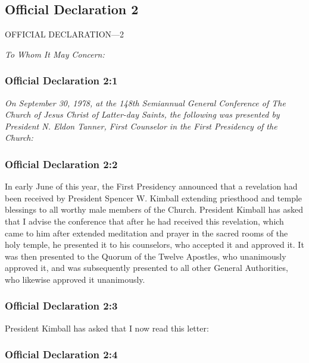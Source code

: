 \subsection{Official Declaration 2}
	\label{OD2}
	
	OFFICIAL DECLARATION—2

	\textit{To Whom It May Concern:}
	
	\subsubsection{Official Declaration 2:1} %
		\label{OD2-1}
		
		\textit{On September 30, 1978, at the 148th Semiannual General Conference of The Church of Jesus Christ of Latter-day Saints, the following was presented by President N. Eldon Tanner, First Counselor in the First Presidency of the Church:}
		
	\subsubsection{Official Declaration 2:2} %
		\label{OD2-2}
		
		In early June of this year, the First Presidency announced that a revelation had been received by President Spencer W. Kimball extending priesthood and temple blessings to all worthy male members of the Church.  President Kimball has asked that I advise the conference that after he had received this revelation, which came to him after extended meditation and prayer in the sacred rooms of the holy temple, he presented it to his counselors, who accepted it and approved it.  It was then presented to the Quorum of the Twelve Apostles, who unanimously approved it, and was subsequently presented to all other General Authorities, who likewise approved it unanimously.
		
	\subsubsection{Official Declaration 2:3} %
		\label{OD2-3}
		
		President Kimball has asked that I now read this letter:
		
	\subsubsection{Official Declaration 2:4} %
		\label{OD2-4}
		
